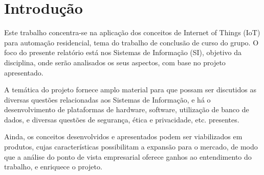 \chapter{Introdução}

Este trabalho concentra-se na aplicação dos conceitos de Internet of Things (IoT) para automação residencial, tema do trabalho de conclusão de curso do grupo. O foco do presente relatório está nos Sistemas de Informação (SI), objetivo da disciplina, onde serão analisados os seus aspectos, com base no projeto apresentado.

A temática do projeto fornece amplo material para que possam ser discutidos as diversas questões relacionadas aos Sistemas de Informação, e há o desenvolvimento de plataformas de hardware, software, utilização de banco de dados, e diversas questões de segurança, ética e privacidade, etc. presentes.

Ainda, os conceitos desenvolvidos e apresentados podem ser viabilizados em produtos, cujas características possibilitam a expansão para o mercado, de modo que a análise do ponto de vista empresarial oferece ganhos ao entendimento do trabalho, e enriquece o projeto.
